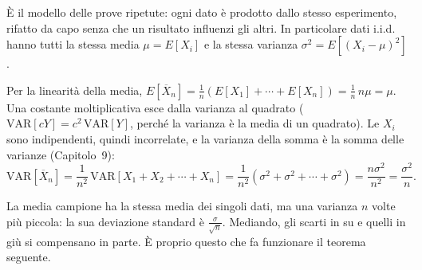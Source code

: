 
È il modello delle prove ripetute: ogni dato è prodotto dallo stesso esperimento, rifatto da capo senza che un risultato
influenzi gli altri. In particolare dati i.i.d. hanno tutti la stessa media $\mu = E[X_i]$ e la stessa varianza
$\sigma^2 = E[(X_i - \mu)^2]$.


\begin{dimostrazione}
 Per la linearità della media,
$E[\overline{X}_n] = \frac{1}{n} \left( E[X_1] + \cdots + E[X_n] \right) = \frac{1}{n}\, n\mu = \mu$.
 Una costante moltiplicativa esce dalla varianza al quadrato ($\mathrm{VAR}[cY] = c^2\,
\mathrm{VAR}[Y]$, perché la varianza è la media di un quadrato). Le $X_i$ sono indipendenti, quindi incorrelate, e la
varianza della somma è la somma delle varianze (Capitolo~9):
\[ \mathrm{VAR}\left[ \overline{X}_n \right] = \frac{1}{n^2}\, \mathrm{VAR}[X_1 + X_2 + \cdots + X_n] = \frac{1}{n^2}
   \left( \sigma^2 + \sigma^2 + \cdots + \sigma^2 \right) = \frac{n \sigma^2}{n^2} = \frac{\sigma^2}{n} . \]
\end{dimostrazione}

La media campione ha la stessa media dei singoli dati, ma una varianza $n$ volte più piccola: la sua deviazione standard
è $\frac{\sigma}{\sqrt{n}}$. Mediando, gli scarti in su e quelli in giù si compensano in parte. È proprio questo che fa
funzionare il teorema seguente.



